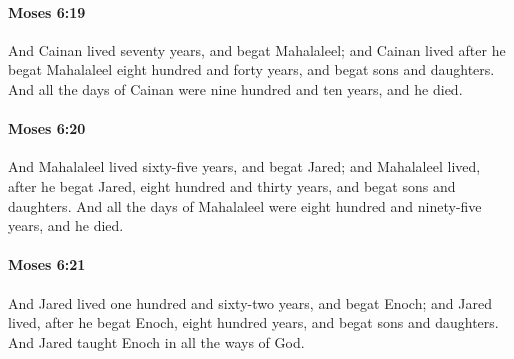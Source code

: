 		\paragraph{Moses 6:19} %
			\label{MOSES-6-19}

			And Cainan lived seventy years, and begat Mahalaleel; and Cainan lived after he begat Mahalaleel eight hundred and forty years, and begat sons and daughters. And all the days of Cainan were nine hundred and ten years, and he died.


		\paragraph{Moses 6:20} %
			\label{MOSES-6-20}

			And Mahalaleel lived sixty-five years, and begat Jared; and Mahalaleel lived, after he begat Jared, eight hundred and thirty years, and begat sons and daughters. And all the days of Mahalaleel were eight hundred and ninety-five years, and he died.


		\paragraph{Moses 6:21} %
			\label{MOSES-6-21}

			And Jared lived one hundred and sixty-two years, and begat Enoch; and Jared lived, after he begat Enoch, eight hundred years, and begat sons and daughters. And Jared taught Enoch in all the ways of God.

